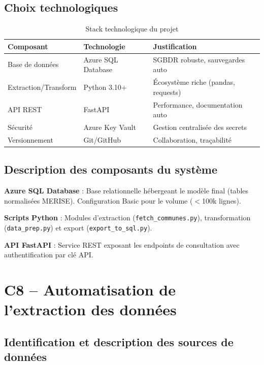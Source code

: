\documentclass[12pt,a4paper]{article}
\begin{document}
\subsection{Choix technologiques}

\begin{table}[H]
\centering
\begin{tabular}{L{3cm} L{4cm} L{6cm}}
    \toprule
    \textbf{Composant} & \textbf{Technologie} & \textbf{Justification} \\
    \midrule
    Base de données & Azure SQL Database & SGBDR robuste, sauvegardes auto \\
    Extraction/Transform & Python 3.10+ & Écosystème riche (pandas, requests) \\
    API REST & FastAPI & Performance, documentation auto \\
    Sécurité & Azure Key Vault & Gestion centralisée des secrets \\
    Versionnement & Git/GitHub & Collaboration, traçabilité \\
    \bottomrule
\end{tabular}
\caption{Stack technologique du projet}
\end{table}

\subsection{Description des composants du système}

\textbf{Azure SQL Database} : Base relationnelle hébergeant le modèle final (tables normalisées MERISE). Configuration Basic pour le volume ($<$100k lignes).

\textbf{Scripts Python} : Modules d'extraction (\texttt{fetch\_communes.py}), transformation (\texttt{data\_prep.py}) et export (\texttt{export\_to\_sql.py}).

\textbf{API FastAPI} : Service REST exposant les endpoints de consultation avec authentification par clé API.

\section{C8 -- Automatisation de l'extraction des données}

\subsection{Identification et description des sources de données}
\end{document}
